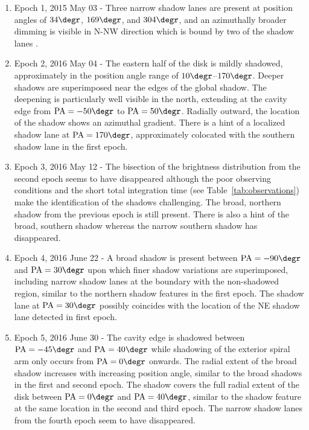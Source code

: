 \documentclass[twocolumn,tighten]{aastex61}
\begin{document}
\begin{enumerate}
  \item Epoch 1, 2015 May 03 - Three narrow shadow lanes are present at position angles of $34\degr$, $169\degr$, and $304\degr$, and an azimuthally broader dimming is visible in N-NW direction which is bound by two of the shadow lanes \citep{stolker2016}. 
  \item Epoch 2, 2016 May 04 - The eastern half of the disk is mildly shadowed, approximately in the position angle range of $10\degr$--$170\degr$. Deeper shadows are superimposed near the edges of the global shadow. The deepening is particularly well visible in the north, extending at the cavity edge from ${\rm PA} = -50\degr$ to ${\rm PA} = 50\degr$. Radially outward, the location of the shadow shows an azimuthal gradient. There is a hint of a localized shadow lane at ${\rm PA} = 170\degr$, approximately colocated with the southern shadow lane in the first epoch.
  \item Epoch 3, 2016 May 12 - The bisection of the brightness distribution from the second epoch seems to have disappeared although the poor observing conditions and the short total integration time (see Table~\ref{tab:observations}) make the identification of the shadows challenging. The broad, northern shadow from the previous epoch is still present. There is also a hint of the broad, southern shadow whereas the narrow southern shadow has disappeared.
  \item Epoch 4, 2016 June 22 - A broad shadow is present between ${\rm PA} = -90\degr$ and ${\rm PA} = 30\degr$ upon which finer shadow variations are superimposed, including narrow shadow lanes at the boundary with the non-shadowed region, similar to the northern shadow features in the first epoch. The shadow lane at ${\rm PA} = 30\degr$ possibly coincides with the location of the NE shadow lane detected in first epoch.
  \item Epoch 5, 2016 June 30 - The cavity edge is shadowed between ${\rm PA} = -45\degr$ and ${\rm PA} = 40\degr$ while shadowing of the exterior spiral arm only occurs from ${\rm PA} = 0\degr$ onwards. The radial extent of the broad shadow increases with increasing position angle, similar to the broad shadows in the first and second epoch. The shadow covers the full radial extent of the disk between ${\rm PA} = 0\degr$ and ${\rm PA} = 40\degr$, similar to the shadow feature at the same location in the second and third epoch. The narrow shadow lanes from the fourth epoch seem to have disappeared.
\end{enumerate}
\end{document}
